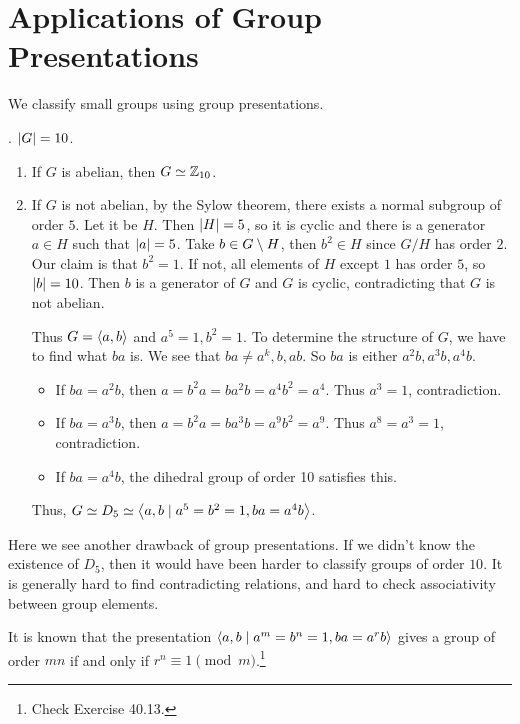 \section*{Applications of Group Presentations}

We classify small groups using group presentations.

\ex. \(\left| G \right| = 10\).
\begin{enumerate}
    \item If \(G\) is abelian, then \(G \simeq \mathbb{Z}_{10}\).
    \item If \(G\) is not abelian, by the Sylow theorem, there exists a normal subgroup of order \(5\). Let it be \(H\). Then \(\left| H \right| = 5\), so it is cyclic and there is a generator \(a \in H\) such that \(\left| a \right| = 5\). Take \(b \in G \setminus H\), then \(b^2 \in H\) since \(G/H\) has order \(2\). Our claim is that \(b^2 = 1\). If not, all elements of \(H\) except \(1\) has order \(5\), so \(\left| b \right| = 10\). Then \(b\) is a generator of \(G\) and \(G\) is cyclic, contradicting that \(G\) is not abelian.

          Thus \(G = \left\langle a, b \right\rangle\) and \(a^5 = 1, b^2 = 1\). To determine the structure of \(G\), we have to find what \(ba\) is. We see that \(ba \neq a^k, b, ab\). So \(ba\) is either \(a^2b, a^3b, a^4b\).

          \begin{itemize}
              \item If \(ba = a^2b\), then \(a = b^2a = ba^2b = a^4b^2 = a^4\). Thus \(a^3 = 1\), contradiction.
              \item If \(ba = a^3b\), then \(a = b^2a = ba^3b = a^9 b^2 = a^9\). Thus \(a^8 = a^3 = 1\), contradiction.
              \item If \(ba = a^4b\), the dihedral group of order 10 satisfies this.
          \end{itemize}
          Thus, \(G \simeq D_5 \simeq \left\langle a, b \mid a^5 = b^2 = 1, ba = a^4b \right\rangle\).
\end{enumerate}

Here we see another drawback of group presentations. If we didn't know the existence of \(D_5\), then it would have been harder to classify groups of order \(10\). It is generally hard to find contradicting relations, and hard to check associativity between group elements.

\rmk It is known that the presentation \(\left\langle a, b \mid a^m = b^n = 1, ba = a^rb \right\rangle\) gives a group of order \(mn\) if and only if \(r^n \equiv 1 \pmod m\).\footnote{Check Exercise 40.13.}

